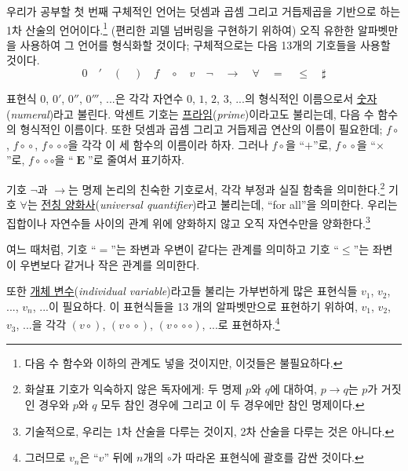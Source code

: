 \documentclass[12pt]{paper}
\begin{document}
우리가 공부할 첫 번째 구체적인 언어는 덧셈과 곱셈 그리고 거듭제곱을 기반으로 하는 1차 산술의 언어이다.\footnote
{
다음 수 함수와 이하의 관계도 넣을 것이지만, 이것들은 불필요하다.
}
(편리한 괴델 넘버링을 구현하기 위하여) 오직 유한한 알파벳만을 사용하여 그 언어를 형식화할 것이다;
구체적으로는 다음 13개의 기호들을 사용할 것이다.
$$ 0 \quad ' \quad \left( \quad \right) \quad f \quad \circ \quad v \quad \lnot \quad \rightarrow \quad \forall \quad = \quad \le \quad \sharp $$

표현식 $0$, $0'$, $0''$, $0'''$, ...은
각각 자연수 $0$, $1$, $2$, $3$, ...의 형식적인 이름으로서 \underline{숫자}(\textit{numeral})라고 불린다.
악센트 기호는 \underline{프라임}(\textit{prime})이라고도 불리는데,
다음 수 함수의 형식적인 이름이다.
또한 덧셈과 곱셈 그리고 거듭제곱 연산의 이름이 필요한데;
$f \circ$, $f \! \circ \! \circ$, $f \! \circ \! \circ \circ$을 각각 이 세 함수의 이름이라 하자.
그러나 $f \circ$을 ``$+$''로, $f \! \circ \! \circ$을 ``$\times$''로, $f \! \circ \! \circ \circ$을 ``$\mathop{\mathbf{E}}$''로 줄여서 표기하자.

기호 $\lnot$과 $\rightarrow$는 명제 논리의 친숙한 기호로서,
각각 부정과 실질 함축을 의미한다.\footnote
{
화살표 기호가 익숙하지 않은 독자에게: 두 명제 $p$와 $q$에 대하여, $p \rightarrow q$는 $p$가 거짓인 경우와 $p$와 $q$ 모두 참인 경우에 그리고 이 두 경우에만 참인 명제이다.
}
기호 $\forall$는 \underline{전칭 양화사}(\textit{universal quantifier})라고 불리는데, ``for all''을 의미한다.
우리는 집합이나 자연수들 사이의 관계 위에 양화하지 않고 오직 자연수만을 양화한다.\footnote
{
기술적으로, 우리는 1차 산술을 다루는 것이지, 2차 산술을 다루는 것은 아니다.
}

여느 때처럼, 기호 ``$=$''는 좌변과 우변이 같다는 관계를 의미하고 기호 ``$\leq$''는 좌변이 우변보다 같거나 작은 관계를 의미한다.

또한 \underline{개체 변수}(\textit{individual variable})라고들 불리는 가부번하게 많은 표현식들 $v_{1}$, $v_{2}$, ..., $v_{n}$, ...이 필요하다.
이 표현식들을 13 개의 알파벳만으로 표현하기 위하여, $v_{1}$, $v_{2}$, $v_{3}$, ...을 각각 $\left( v \circ \right)$, $\left( v \! \circ \! \circ \right)$, $\left( v \! \circ \! \circ \circ \right)$, ...로 표현하자.\footnote
{
그러므로 $v_{n}$은 ``$v$'' 뒤에 $n$개의 $\circ$가 따라온 표현식에 괄호를 감싼 것이다.
}
\end{document}
